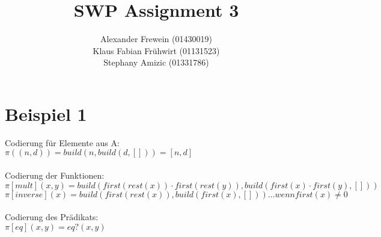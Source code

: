 \documentclass[12pt,runningheads,a4paper]{llncs}
\begin{document}
\title{SWP Assignment 3}


%
%
\author{Alexander Frewein (01430019)\\
		Klaus Fabian Frühwirt (01131523)\\
		Stephany Amizic (01331786)}

%




\maketitle
\section*{Beispiel 1}
Codierung für Elemente aus A:\\
$\pi((n,d)) = build(n, build(d,[])) = [n,d]$ \\
\\
Codierung der Funktionen: \\
$\pi[mult](x, y) = build(first(rest(x)) \cdot first(rest(y)), build(f irst(x) \cdot first(y), []))$\\
$\pi[inverse](x) = build(first(rest(x)), build(first(x), [])). . . wenn first(x)\neq 0$\\
\\
Codierung des Prädikats:\\
$\pi[eq](x, y) = eq?(x, y)$\\
\\
\end{document}
